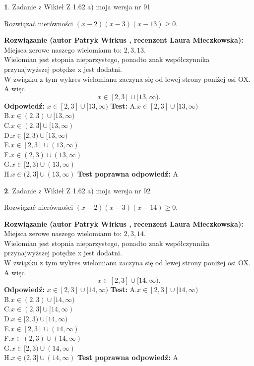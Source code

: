 \documentclass[12pt, a4paper]{article}
\theoremstyle{definition} %
\newtheorem{zad}{}
\newcommand{\zadStart}[1]{\begin{zad}#1\newline}
\newcommand{\zadStop}{\end{zad}}
\newcommand{\rozwStart}[2]{\noindent \textbf{Rozwiązanie (autor #1 , recenzent #2): }\newline}
\newcommand{\rozwStop}{\newline}
\newcommand{\odpStart}{\noindent \textbf{Odpowiedź:}\newline}
\newcommand{\odpStop}{\newline}
\newcommand{\testStart}{\noindent \textbf{Test:}\newline}
\newcommand{\testStop}{\newline}
\newcommand{\kluczStart}{\noindent \textbf{Test poprawna odpowiedź:}\newline}
\newcommand{\kluczStop}{\newline}
\begin{document}
\zadStart{Zadanie z Wikieł Z 1.62 a) moja wersja nr 91}

Rozwiązać nierówności $(x-2)(x-3)(x-13)\ge0$.
\zadStop
\rozwStart{Patryk Wirkus}{Laura Mieczkowska}
Miejsca zerowe naszego wielomianu to: $2, 3, 13$.\\
Wielomian jest stopnia nieparzystego, ponadto znak współczynnika przy\linebreak najwyższej potędze x jest dodatni.\\ W związku z tym wykres wielomianu zaczyna się od lewej strony poniżej osi OX. A więc $$x \in [2,3] \cup [13,\infty).$$
\rozwStop
\odpStart
$x \in [2,3] \cup [13,\infty)$
\odpStop
\testStart
A.$x \in [2,3] \cup [13,\infty)$\\
B.$x \in (2,3) \cup [13,\infty)$\\
C.$x \in (2,3] \cup [13,\infty)$\\
D.$x \in [2,3) \cup [13,\infty)$\\
E.$x \in [2,3] \cup (13,\infty)$\\
F.$x \in (2,3) \cup (13,\infty)$\\
G.$x \in [2,3) \cup (13,\infty)$\\
H.$x \in (2,3] \cup (13,\infty)$
\testStop
\kluczStart
A
\kluczStop



\zadStart{Zadanie z Wikieł Z 1.62 a) moja wersja nr 92}

Rozwiązać nierówności $(x-2)(x-3)(x-14)\ge0$.
\zadStop
\rozwStart{Patryk Wirkus}{Laura Mieczkowska}
Miejsca zerowe naszego wielomianu to: $2, 3, 14$.\\
Wielomian jest stopnia nieparzystego, ponadto znak współczynnika przy\linebreak najwyższej potędze x jest dodatni.\\ W związku z tym wykres wielomianu zaczyna się od lewej strony poniżej osi OX. A więc $$x \in [2,3] \cup [14,\infty).$$
\rozwStop
\odpStart
$x \in [2,3] \cup [14,\infty)$
\odpStop
\testStart
A.$x \in [2,3] \cup [14,\infty)$\\
B.$x \in (2,3) \cup [14,\infty)$\\
C.$x \in (2,3] \cup [14,\infty)$\\
D.$x \in [2,3) \cup [14,\infty)$\\
E.$x \in [2,3] \cup (14,\infty)$\\
F.$x \in (2,3) \cup (14,\infty)$\\
G.$x \in [2,3) \cup (14,\infty)$\\
H.$x \in (2,3] \cup (14,\infty)$
\testStop
\kluczStart
A
\kluczStop
\end{document}

